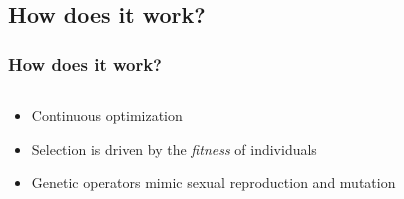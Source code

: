 \documentclass{beamer}
\begin{document}
\subsection[Evolutionary Computation]{How does it work?}

\begin{frame}
	\frametitle{How does it work?}
\begin{columns}[T]
\begin{column}{0.6\textwidth}
\begin{itemize}
	\item Continuous optimization \\
	\item Selection is driven by the \textit{fitness} of individuals
	\item Genetic operators mimic sexual reproduction and mutation
	

\end{itemize}
\end{column}
\end{columns}
\end{frame}
\end{document}

